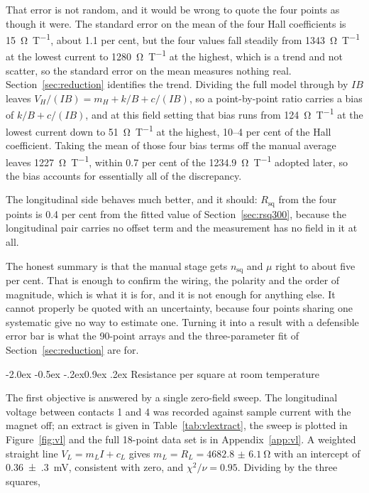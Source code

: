 \documentclass[11pt,a4paper]{article}
\makeatletter
\renewcommand\subsection{\@startsection{subsection}{2}{\z@}%
  {-2.0ex \@plus -0.5ex \@minus -.2ex}{0.9ex \@plus .2ex}%
  {\normalfont\normalsize\bfseries}}
\newcommand{\Rsq}{R_{\mathrm{sq}}}
\newcommand{\nsq}{n_{\mathrm{sq}}}
\makeatother
\begin{document}
That error is not random, and it would be wrong to quote the four points as though it were. The
standard error on the mean of the four Hall coefficients is \qty{15}{\ohm\per\tesla}, about
\num{1.1} per cent, but the four values fall steadily from \qty{1343}{\ohm\per\tesla} at the
lowest current to \qty{1280}{\ohm\per\tesla} at the highest, which is a trend and not scatter,
so the standard error on the mean measures nothing real. Section~\ref{sec:reduction} identifies
the trend. Dividing the full model through by $IB$ leaves
$V_H/(IB) = m_H + k/B + c/(IB)$, so a point-by-point ratio carries a bias of $k/B + c/(IB)$, and
at this field setting that bias runs from \qty{124}{\ohm\per\tesla} at the lowest current down
to \qty{51}{\ohm\per\tesla} at the highest, \numrange{10}{4} per cent of the Hall coefficient.
Taking the mean of those four bias terms off the manual average leaves
\qty{1227}{\ohm\per\tesla}, within \num{0.7} per cent of the \qty{1234.9}{\ohm\per\tesla}
adopted later, so the bias accounts for essentially all of the discrepancy.

The longitudinal side behaves much better, and it should: $\Rsq$ from the four points is
\num{0.4} per cent from the fitted value of Section~\ref{sec:rsq300}, because the longitudinal
pair carries no offset term and the measurement has no field in it at all.

The honest summary is that the manual stage gets $\nsq$ and $\mu$ right to about five per cent.
That is enough to confirm the wiring, the polarity and the order of magnitude, which is what it
is for, and it is not enough for anything else. It cannot properly be quoted with an
uncertainty, because four points sharing one systematic give no way to estimate one. Turning it
into a result with a defensible error bar is what the \num{90}-point arrays and the
three-parameter fit of Section~\ref{sec:reduction} are for.

\subsection{Resistance per square at room temperature}
\label{sec:rsq300}

The first objective is answered by a single zero-field sweep. The longitudinal voltage
between contacts 1 and 4 was recorded against sample current with the magnet off; an extract
is given in Table~\ref{tab:vlextract}, the sweep is plotted in Figure~\ref{fig:vl} and the
full \num{18}-point data set is in Appendix~\ref{app:vl}. A weighted straight line
$V_L = m_L I + c_L$ gives $m_L = R_L = \qty{4682.8(61)}{\ohm}$ with an intercept of
\qty{0.36(30)}{\milli\volt}, consistent with zero, and $\chi^2/\nu = 0.95$. Dividing by the
three squares,
\end{document}
